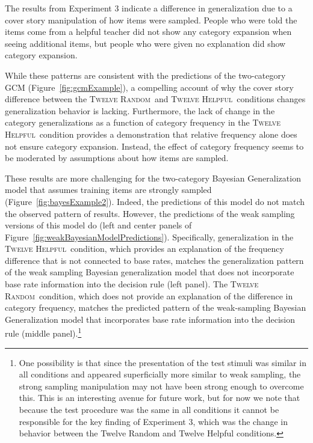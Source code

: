 \documentclass[doc,apacite]{apa6}
\newcommand{\random}{\textsc{Twelve Random}}
\newcommand{\helpful}{\textsc{Twelve Helpful}}
\begin{document}
The results from Experiment 3 indicate a difference in generalization due to a cover story manipulation of how items were sampled.
People who were told the items come from a helpful teacher did not show any category expansion when seeing additional items, but people who were given no explanation did show category expansion.


While these patterns are consistent with the predictions of the two-category GCM (Figure~\ref{fig:gcmExample}), a compelling account of why the cover story difference between the \random\ and \helpful\ conditions changes generalization behavior is lacking.
Furthermore, the lack of change in the category generalizations as a function of category frequency in the \helpful\ condition provides a demonstration that relative frequency alone does not ensure category expansion. Instead, the effect of category frequency seems to be moderated by assumptions about how items are sampled. 

These results are more challenging for the two-category Bayesian Generalization model that assumes training items are strongly sampled (Figure~\ref{fig:bayesExample2}).
Indeed, the predictions of this model do not match the observed pattern of results.
However, the predictions of the weak sampling versions of this model do (left and center panels of Figure~\ref{fig:weakBayesianModelPredictions}). 
Specifically, generalization in the \helpful\ condition, which provides an explanation of the frequency difference that is not connected to base rates, matches the generalization pattern of the weak sampling Bayesian generalization model that does not incorporate base rate information into the decision rule (left panel). The \random\ condition, which does not provide an
explanation of the difference in category frequency, matches the predicted pattern of the weak-sampling Bayesian Generalization model that incorporates base rate information into the decision rule (middle panel).\footnote{One possibility is that since the presentation of the test stimuli was similar in all conditions and appeared superficially more similar to weak sampling, the strong sampling manipulation may not have been strong enough to overcome this. This is an interesting avenue for future work, but for now we note that because the test procedure was the same in all conditions it cannot be responsible for the key finding of Experiment 3, which was the change in behavior between the {\sc Twelve Random} and {\sc Twelve Helpful} conditions.}
\end{document}

